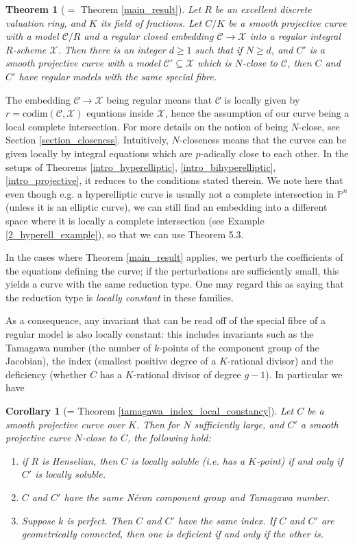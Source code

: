 \documentclass{article}
\theoremstyle{definition}
\theoremstyle{plain}
\newtheorem{thm}[defn]{Theorem}
\newtheorem{cor}[defn]{Corollary}
\theoremstyle{remark}
\newcommand{\codim}{\mathrm{codim}}
\begin{document}
	\begin{thm}[$=$ Theorem \ref{main_result}]
	Let $R$ be an excellent discrete valuation ring, and $K$ its field of fractions. Let $C/K$ be a smooth projective curve with a model $\mathcal{C}/R$ and a regular closed embedding $\mathcal{C}\to \mathcal{X}$ into a regular integral $R$-scheme $\mathcal{X}$. Then there is an integer $d\ge 1$ such that if $N\ge d$, and $C'$ is a smooth projective curve with a model $\mathcal{C}'\subseteq \mathcal{X}$ which is $N$-close to $\mathcal{C}$, then $C$ and $C'$ have regular models with the same special fibre.
	\end{thm}
	The embedding $\mathcal{C}\to \mathcal{X}$ being regular means that $\mathcal{C}$ is locally given by $r = \codim(\mathcal{C}, \mathcal{X})$ equations inside $\mathcal{X}$, hence the assumption of our curve being a local complete intersection.	For more details on the notion of being $N$-close, see Section \ref{section_closeness}. Intuitively, $N$-closeness means that the curves can be given locally by integral equations which are $p$-adically close to each other. In the setups of Theorems \ref{intro_hyperelliptic}, \ref{intro_bihyperelliptic}, \ref{intro_projective}, it reduces to the conditions stated therein. We note here that even though e.g. a hyperelliptic curve is usually not a complete intersection in $\mathbb{P}^n$ (unless it is an elliptic curve), we can still find an embedding into a different space where it is locally a complete intersection (see Example \ref{2_hyperell_example}), so that we can use Theorem 5.3.
	
	In the cases where Theorem \ref{main_result} applies, we perturb the coefficients of the equations defining the curve; if the perturbations are sufficiently small, this yields a curve with the same reduction type. One may regard this as saying that the reduction type is \emph{locally constant} in these families. 
	
	As a consequence, any invariant that can be read off of the special fibre of a regular model is also locally constant: this includes invariants such as the Tamagawa number (the number of $k$-points of the component group of the Jacobian), the index (smallest positive degree of a $K$-rational divisor) and the deficiency (whether $C$ has a $K$-rational divisor of degree $g-1$). In particular we have
	\begin{cor}[= Theorem \ref{tamagawa_index_local_constancy}]
		Let $C$ be a smooth projective curve over $K$. Then for $N$ sufficiently large, and $C'$ a smooth projective curve $N$-close to $C$, the following hold:
		\begin{enumerate}
			\item if $R$ is Henselian, then $C$ is locally soluble (i.e. has a $K$-point) if and only if $C'$ is locally soluble.
			\item $C$ and $C'$ have the same Néron component group and Tamagawa number.
			\item Suppose $k$ is perfect. Then $C$ and $C'$ have the same index. If $C$ and $C'$ are geometrically connected, then one is deficient if and only if the other is.
		\end{enumerate}
	\end{cor}
	
\end{document}
